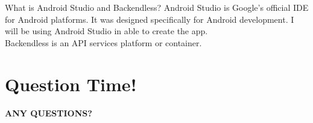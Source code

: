 \documentclass{beamer}
\begin{document}
		\begin{frame}{What is Android Studio and Backendless?}
			\hspace{.25 in} Android Studio is Google's official IDE for Android platforms. It was designed specifically for Android development. I will be using Android Studio in able to create the app.\\
			\hspace{.25 in} Backendless is an API  services platform or container.
		\end{frame}
	
	\section{Question Time!}
		\begin{frame}
			\begin{center}
				\Huge \textbf{ANY QUESTIONS?}
			\end{center}
		\end{frame}
		
\end{document}
